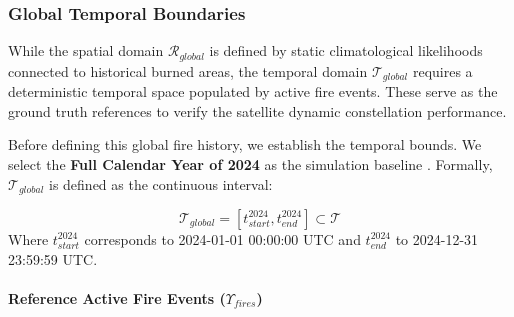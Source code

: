 

\subsubsection{Global Temporal Boundaries}

While the spatial domain $\mathcal{R}_{global}$ is defined by static climatological likelihoods connected to historical burned areas, the temporal domain $\mathcal{T}_{global}$ requires a deterministic temporal space populated by active fire events. These serve as the ground truth references to verify the satellite dynamic constellation performance.

Before defining this global fire history, we establish the temporal bounds. We select the \textbf{Full Calendar Year of 2024} as the simulation baseline . Formally, $\mathcal{T}_{global}$ is defined as the continuous interval:

\begin{equation}
    \mathcal{T}_{global} = [t_{start}^{2024}, t_{end}^{2024}] \subset \mathcal{T}
\end{equation}
Where $t_{start}^{2024}$ corresponds to 2024-01-01 00:00:00 UTC and $t_{end}^{2024}$ to 2024-12-31 23:59:59 UTC.

\paragraph{Reference Active Fire Events ($\Upsilon_{fires}$)} \hspace{0pt}

